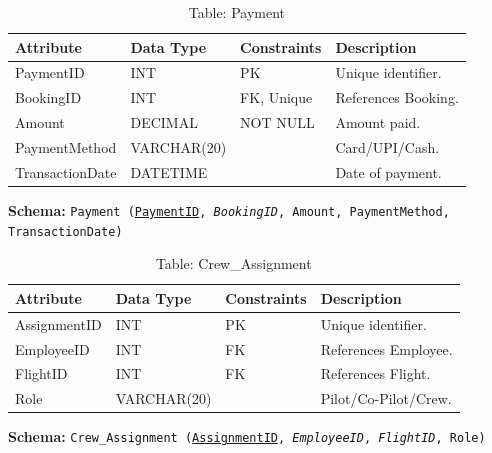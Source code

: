 \documentclass[12pt, a4paper]{article}
\begin{document}
	\begin{table}[H]
		\centering
		\caption{Table: Payment}
		\begin{tabular}{|l|l|l|p{5cm}|}
			\hline
			\textbf{Attribute} & \textbf{Data Type} & \textbf{Constraints} & \textbf{Description} \\
			\hline
			PaymentID & INT & PK & Unique identifier. \\
			\hline
			BookingID & INT & FK, Unique & References Booking. \\
			\hline
			Amount & DECIMAL & NOT NULL & Amount paid. \\
			\hline
			PaymentMethod & VARCHAR(20) & & Card/UPI/Cash. \\
			\hline
			TransactionDate & DATETIME & & Date of payment. \\
			\hline
		\end{tabular}
	\end{table}
	\noindent \textbf{Schema:} \texttt{Payment (\underline{PaymentID}, \textit{BookingID}, Amount, PaymentMethod, TransactionDate)}
	
	\begin{table}[H]
		\centering
		\caption{Table: Crew\_Assignment}
		\begin{tabular}{|l|l|l|p{5cm}|}
			\hline
			\textbf{Attribute} & \textbf{Data Type} & \textbf{Constraints} & \textbf{Description} \\
			\hline
			AssignmentID & INT & PK & Unique identifier. \\
			\hline
			EmployeeID & INT & FK & References Employee. \\
			\hline
			FlightID & INT & FK & References Flight. \\
			\hline
			Role & VARCHAR(20) & & Pilot/Co-Pilot/Crew. \\
			\hline
		\end{tabular}
	\end{table}
	\noindent \textbf{Schema:} \texttt{Crew\_Assignment (\underline{AssignmentID}, \textit{EmployeeID}, \textit{FlightID}, Role)}
	
\end{document}
